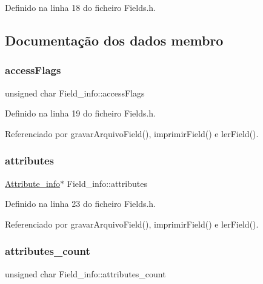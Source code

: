Definido na linha 18 do ficheiro Fields.\+h.



\subsection{Documentação dos dados membro}
\mbox{\label{structField__info_a518c6efb3e5b805d738375e3411bc7b0}} 
\subsubsection{\texorpdfstring{access\+Flags}{accessFlags}}
{\footnotesize\ttfamily unsigned char Field\+\_\+info\+::access\+Flags}



Definido na linha 19 do ficheiro Fields.\+h.



Referenciado por gravar\+Arquivo\+Field(), imprimir\+Field() e ler\+Field().

\mbox{\label{structField__info_a82d5d1b1ba57dfc6b711072777d92894}} 
\subsubsection{\texorpdfstring{attributes}{attributes}}
{\footnotesize\ttfamily \hyperlink{structAttribute__info}{Attribute\+\_\+info}$\ast$ Field\+\_\+info\+::attributes}



Definido na linha 23 do ficheiro Fields.\+h.



Referenciado por gravar\+Arquivo\+Field(), imprimir\+Field() e ler\+Field().

\mbox{\label{structField__info_a293084dbdbd13fce49fd95edf118db31}} 
\subsubsection{\texorpdfstring{attributes\+\_\+count}{attributes\_count}}
{\footnotesize\ttfamily unsigned char Field\+\_\+info\+::attributes\+\_\+count}



